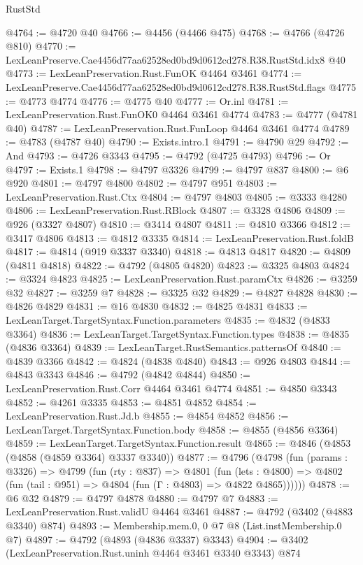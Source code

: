 \begin{lexlean}{RustStd}
\begin{coremodule}
@4764 := @4720 @40
@4766 := @4456 (@4466 @475)
@4768 := @4766 (@4726 @810)
@4770 := LexLeanPreserve.Cae4456d77aa62528ed0bd9d0612cd278.R38.RustStd.idx8 @40
@4773 := LexLeanPreservation.Rust.FunOK @4464 @3461
@4774 := LexLeanPreserve.Cae4456d77aa62528ed0bd9d0612cd278.R38.RustStd.flags
@4775 := @4773 @4774
@4776 := @4775 @40
@4777 := Or.inl
@4781 := LexLeanPreservation.Rust.FunOK0 @4464 @3461 @4774
@4783 := @4777 (@4781 @40)
@4787 := LexLeanPreservation.Rust.FunLoop @4464 @3461 @4774
@4789 := @4783 (@4787 @40)
@4790 := Exists.intro.{1}
@4791 := @4790 @29
@4792 := And
@4793 := @4726 @3343
@4795 := @4792 (@4725 @4793)
@4796 := Or
@4797 := Exists.{1}
@4798 := @4797 @3326
@4799 := @4797 @837
@4800 := @6 @920
@4801 := @4797 @4800
@4802 := @4797 @951
@4803 := LexLeanPreservation.Rust.Ctx
@4804 := @4797 @4803
@4805 := @3333 @4280
@4806 := LexLeanPreservation.Rust.RBlock
@4807 := @3328 @4806
@4809 := @926 (@3327 @4807)
@4810 := @3414 @4807
@4811 := @4810 @3366
@4812 := @3417 @4806
@4813 := @4812 @3335
@4814 := LexLeanPreservation.Rust.foldB
@4817 := @4814 (@919 @3337 @3340)
@4818 := @4813 @4817
@4820 := @4809 (@4811 @4818)
@4822 := @4792 (@4805 @4820)
@4823 := @3325 @4803
@4824 := @3324 @4823
@4825 := LexLeanPreservation.Rust.paramCtx
@4826 := @3259 @32
@4827 := @3259 @7
@4828 := @3325 @32
@4829 := @4827 @4828
@4830 := @4826 @4829
@4831 := @16 @4830
@4832 := @4825 @4831
@4833 := LexLeanTarget.TargetSyntax.Function.parameters
@4835 := @4832 (@4833 @3364)
@4836 := LexLeanTarget.TargetSyntax.Function.types
@4838 := @4835 (@4836 @3364)
@4839 := LexLeanTarget.RustSemantics.patternsOf
@4840 := @4839 @3366
@4842 := @4824 (@4838 @4840)
@4843 := @926 @4803
@4844 := @4843 @3343
@4846 := @4792 (@4842 @4844)
@4850 := LexLeanPreservation.Rust.Corr @4464 @3461 @4774
@4851 := @4850 @3343
@4852 := @4261 @3335
@4853 := @4851 @4852
@4854 := LexLeanPreservation.Rust.Jd.b
@4855 := @4854 @4852
@4856 := LexLeanTarget.TargetSyntax.Function.body
@4858 := @4855 (@4856 @3364)
@4859 := LexLeanTarget.TargetSyntax.Function.result
@4865 := @4846 (@4853 (@4858 (@4859 @3364) @3337 @3340))
@4877 := @4796
    (@4798
      (fun (params : @3326) =>
      @4799
        (fun (rty : @837) =>
        @4801
          (fun (lets : @4800) =>
          @4802 (fun (tail : @951) => @4804 (fun (Γ : @4803) => @4822 @4865))))))
@4878 := @6 @32
@4879 := @4797 @4878
@4880 := @4797 @7
@4883 := LexLeanPreservation.Rust.validU @4464 @3461
@4887 := @4792 (@3402 (@4883 @3340) @874)
@4893 := Membership.mem.{0, 0} @7 @8 (List.instMembership.{0} @7)
@4897 := @4792 (@4893 (@4836 @3337) @3343)
@4904 := @3402 (LexLeanPreservation.Rust.uninh @4464 @3461 @3340 @3343) @874

\end{coremodule}
\end{lexlean}
